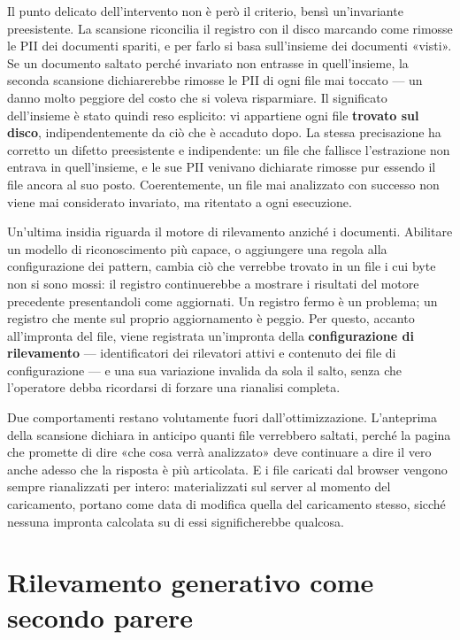 Il punto delicato dell'intervento non è però il criterio, bensì un'invariante preesistente. La scansione riconcilia il registro con il disco marcando come rimosse le PII dei documenti spariti, e per farlo si basa sull'insieme dei documenti «visti». Se un documento saltato perché invariato non entrasse in quell'insieme, la seconda scansione dichiarerebbe rimosse le PII di ogni file mai toccato --- un danno molto peggiore del costo che si voleva risparmiare. Il significato dell'insieme è stato quindi reso esplicito: vi appartiene ogni file \textbf{trovato sul disco}, indipendentemente da ciò che è accaduto dopo. La stessa precisazione ha corretto un difetto preesistente e indipendente: un file che fallisce l'estrazione non entrava in quell'insieme, e le sue PII venivano dichiarate rimosse pur essendo il file ancora al suo posto. Coerentemente, un file mai analizzato con successo non viene mai considerato invariato, ma ritentato a ogni esecuzione. \medskip

Un'ultima insidia riguarda il motore di rilevamento anziché i documenti. Abilitare un modello di riconoscimento più capace, o aggiungere una regola alla configurazione dei pattern, cambia ciò che verrebbe trovato in un file i cui byte non si sono mossi: il registro continuerebbe a mostrare i risultati del motore precedente presentandoli come aggiornati. Un registro fermo è un problema; un registro che mente sul proprio aggiornamento è peggio. Per questo, accanto all'impronta del file, viene registrata un'impronta della \textbf{configurazione di rilevamento} --- identificatori dei rilevatori attivi e contenuto dei file di configurazione --- e una sua variazione invalida da sola il salto, senza che l'operatore debba ricordarsi di forzare una rianalisi completa. \medskip

Due comportamenti restano volutamente fuori dall'ottimizzazione. L'anteprima della scansione dichiara in anticipo quanti file verrebbero saltati, perché la pagina che promette di dire «che cosa verrà analizzato» deve continuare a dire il vero anche adesso che la risposta è più articolata. E i file caricati dal browser vengono sempre rianalizzati per intero: materializzati sul server al momento del caricamento, portano come data di modifica quella del caricamento stesso, sicché nessuna impronta calcolata su di essi significherebbe qualcosa.

\section{Rilevamento generativo come secondo parere}
\label{sec:sv-ai-detector}


